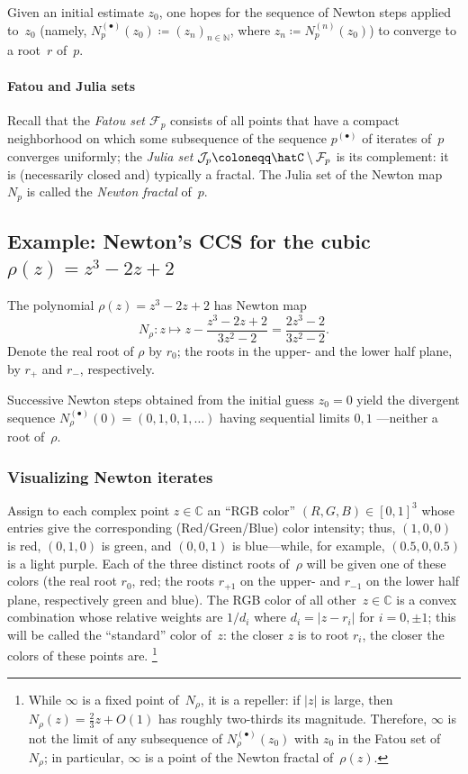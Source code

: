 Given an initial estimate $z_0$, one hopes for the sequence of Newton steps applied to~$z_0$ (namely, $N_p^{(\bullet)}(z_0) \coloneqq (z_n)_{n\in \mathbb{N}}$, where $z_n \coloneqq N_p^{(n)}(z_0)$)
to converge to a root~$r$ of~$p$.

\paragraph{Fatou and Julia sets}
Recall that the \emph{Fatou set $\mathcal{F}_p$} consists of all points that have a compact neighborhood on which some subsequence of the sequence $p^{(\bullet)}$ of iterates of~$p$ converges uniformly;
the \emph{Julia set} $\mathcal{J}_p\coloneqq\hatC\setminus \mathcal{F}_p$ is its complement:
it is (necessarily closed and) typically a fractal.
The Julia set of the Newton map~$N_p$ is called the \emph{Newton fractal} of~$p$.

\subsection{Example: Newton's CCS for the cubic \texorpdfstring{${\rho}(z) = z^3-2z+2$}{rho(z) = z3-2z+2}}\label{sec:Newton-cubic}
The polynomial ${\rho}(z) = z^3-2z+2$ has Newton map
\begin{equation*}
  N_{\rho}: z \mapsto z - \frac{z^3-2z+2}{3z^2-2} = \frac{2z^3-2}{3z^2-2}.
\end{equation*}
Denote the real root of $\rho$ by $r_0$; the roots in the upper- and the lower half plane, by $r_{+}$ and $r_{-}$, respectively.

Successive Newton steps obtained from the initial guess $z_0=0$ yield the divergent sequence $N_{\rho}^{(\bullet)}(0) = (0, 1, 0, 1, \dots)$ having sequential limits $0, 1$ —neither a root of~${\rho}$.

\subsubsection{Visualizing Newton iterates}
Assign to each complex point $z\in \mathbb{C}$ an “RGB color” $(R,G,B)\in[0,1]^3$ whose entries give the corresponding (Red/Green/Blue) color intensity;
thus, $(1,0,0)$ is red, $(0,1,0)$ is green, and $(0,0,1)$ is blue—while, for example, $(0.5, 0, 0.5)$ is a light purple.
Each of the three distinct roots of~${\rho}$ will be given one of these colors
(the real root $r_0$, red; the roots $r_{+1}$ on the upper- and $r_{-1}$ on the lower half plane, respectively green and blue).
The RGB color of all other~$z\in \mathbb{C}$ is a convex combination whose relative weights are $1/d_i$ where $d_i = |z-r_i|$ for $i=0, \pm1$;
this will be called the “standard” color of~$z$:
the closer $z$ is to root $r_i$, the closer the colors of these points are.%
\footnote{While $\infty$ is a fixed point of~$N_{\rho}$, it is a repeller: if $|z|$ is large, then $N_{\rho}(z) = \frac{2}{3}z + O(1)$ has roughly two-thirds its magnitude.
Therefore, $\infty$ is not the limit of any subsequence of $N_{\rho}^{(\bullet)}(z_0)$ with $z_0$ in the Fatou set of~$N_{\rho}$; in particular, $\infty$ is a point of the Newton fractal of~${\rho}(z)$.}

